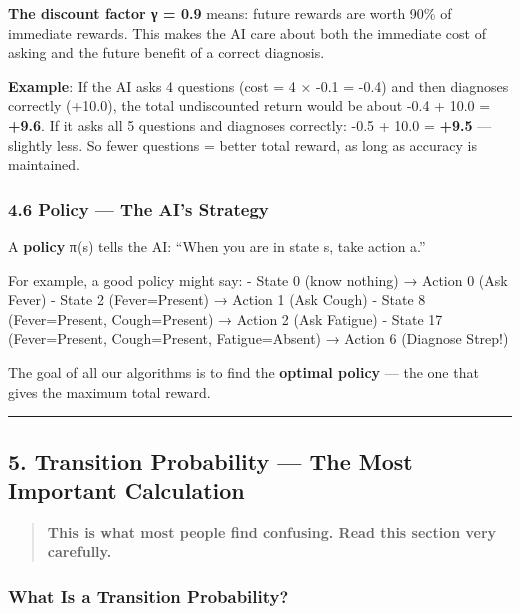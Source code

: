 \documentclass[
]{article}
\begin{document}
\textbf{The discount factor γ = 0.9} means: future rewards are worth
90\% of immediate rewards. This makes the AI care about both the
immediate cost of asking and the future benefit of a correct diagnosis.

\textbf{Example}: If the AI asks 4 questions (cost = 4 × -0.1 = -0.4)
and then diagnoses correctly (+10.0), the total undiscounted return
would be about -0.4 + 10.0 = \textbf{+9.6}. If it asks all 5 questions
and diagnoses correctly: -0.5 + 10.0 = \textbf{+9.5} --- slightly less.
So fewer questions = better total reward, as long as accuracy is
maintained.

\hypertarget{policy-the-ais-strategy}{%
\subsubsection{4.6 Policy --- The AI's
Strategy}\label{policy-the-ais-strategy}}

A \textbf{policy} π(s) tells the AI: ``When you are in state s, take
action a.''

For example, a good policy might say: - State 0 (know nothing) → Action
0 (Ask Fever) - State 2 (Fever=Present) → Action 1 (Ask Cough) - State 8
(Fever=Present, Cough=Present) → Action 2 (Ask Fatigue) - State 17
(Fever=Present, Cough=Present, Fatigue=Absent) → Action 6 (Diagnose
Strep!)

The goal of all our algorithms is to find the \textbf{optimal policy}
--- the one that gives the maximum total reward.

\begin{center}\rule{0.5\linewidth}{0.5pt}\end{center}

\hypertarget{transition-probability-the-most-important-calculation}{%
\subsection{5. Transition Probability --- The Most Important
Calculation}\label{transition-probability-the-most-important-calculation}}

\begin{quote}
\textbf{This is what most people find confusing. Read this section very
carefully.}
\end{quote}

\hypertarget{what-is-a-transition-probability}{%
\subsubsection{What Is a Transition
Probability?}\label{what-is-a-transition-probability}}
\end{document}
